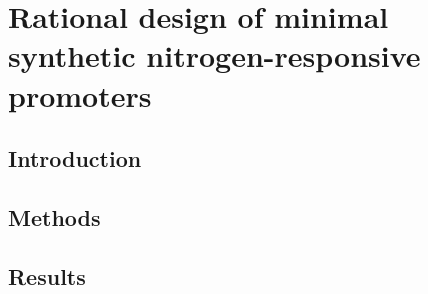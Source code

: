 \documentclass[../main.tex]{subfiles}
\begin{document}
\chapter{Rational design of minimal synthetic nitrogen-responsive promoters}
\label{chapter4}
\section{Introduction}
\label{chapter4:introduction}

\section{Methods}
\label{chapter4:methods}

\section{Results}
\label{chapter4:results}
\end{document}
